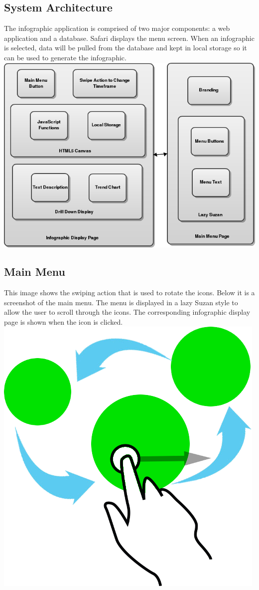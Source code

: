 \documentclass[11pt,a4paper,oneside]{article}
\begin{document}
\subsection{System Architecture}

The infographic application is comprised of two major components: a web application and a database. Safari displays the menu screen. When an infographic is selected, data will be pulled from the database and kept in local storage so it can be used to generate the infographic.\\

\includegraphics[width=1\textwidth]{images/Capstone_-_System_Architecture_Diagram.png}\\   

\subsection {Main Menu}
This image shows the swiping action that is used to rotate the icons.  Below it is a screenshot of the main menu.  The menu is displayed in a lazy Suzan style to allow the user to scroll through the icons.  The corresponding infographic display page is shown when the icon is clicked.\\

\includegraphics[width=.4\textwidth]{images/switcheroo.png}\\
\end{document}

